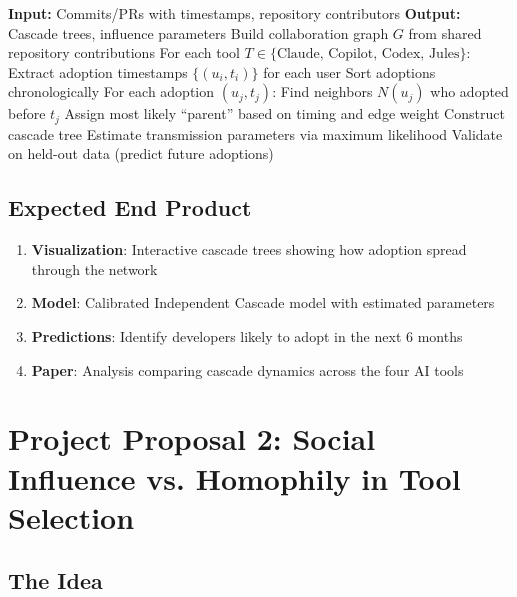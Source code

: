 \documentclass[11pt,letterpaper]{article}
\begin{document}
\begin{algorithm}
\caption{Cascade Detection in AI Tool Adoption}
\begin{algorithmic}[1]
\State \textbf{Input:} Commits/PRs with timestamps, repository contributors
\State \textbf{Output:} Cascade trees, influence parameters
\State
\State Build collaboration graph $G$ from shared repository contributions
\State For each tool $T \in \{\text{Claude, Copilot, Codex, Jules}\}$:
\State \quad Extract adoption timestamps $\{(u_i, t_i)\}$ for each user
\State \quad Sort adoptions chronologically
\State \quad For each adoption $(u_j, t_j)$:
\State \quad\quad Find neighbors $N(u_j)$ who adopted before $t_j$
\State \quad\quad Assign most likely ``parent'' based on timing and edge weight
\State \quad Construct cascade tree
\State Estimate transmission parameters via maximum likelihood
\State Validate on held-out data (predict future adoptions)
\end{algorithmic}
\end{algorithm}

\subsection{Expected End Product}

\begin{enumerate}
    \item \textbf{Visualization}: Interactive cascade trees showing how adoption spread through the network
    \item \textbf{Model}: Calibrated Independent Cascade model with estimated parameters
    \item \textbf{Predictions}: Identify developers likely to adopt in the next 6 months
    \item \textbf{Paper}: Analysis comparing cascade dynamics across the four AI tools
\end{enumerate}

\section{Project Proposal 2: Social Influence vs. Homophily in Tool Selection}

\subsection{The Idea}
\end{document}
